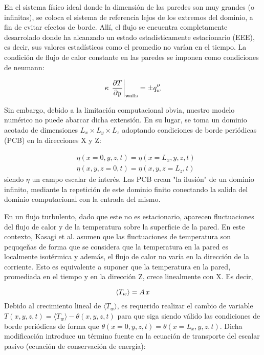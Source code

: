 En el sistema físico ideal donde la dimensión de las paredes son muy grandes (o infinitas), se coloca el sistema de referencia lejos de los extremos del dominio, a fin de evitar efectos de borde. Allí, el flujo se encuentra completamente desarrolado donde ha alcanzado un estado estadísticamente estacionario (EEE), es decir, sus valores estadísticos como el promedio no varían en el tiempo. La condición de flujo de calor constante en las paredes se imponen como condiciones de neumann:

\begin{equation}
\kappa \hspace{0.5mm} \left. \frac{\partial T}{\partial y} \right\vert_{\text{walls}} = \pm q''_w
\label{eq:neumann}
\end{equation}



Sin embargo, debido a la limitación computacional obvia, nuestro modelo numérico no puede abarcar dicha extensión. En su lugar, se toma un dominio acotado de dimensiones $L_x \times L_y \times L_z$ adoptando condiciones de borde periódicas (PCB) en la direcciones X y Z:

\begin{align}
& \eta(x=0,y,z,t) = \eta(x=L_x,y,z,t) \\ 
& \eta(x,y,z=0,t) = \eta(x,y,z=L_z,t)
\end{align}
siendo $\eta$ un campo escalar de interés. Las PCB crean "la ilusión" de un dominio infinito, mediante la repetición de este dominio finito conectando la salida del dominio computacional con la entrada del mismo.

En un flujo turbulento, dado que este no es estacionario, aparecen fluctuaciones del flujo de calor y de la temperatura sobre la superficie de la pared. En este contexto, Kasagi et al. \cite{kasagi1992direct} asumen que las fluctuaciones de temperatura son pequqeñas de forma que se considera que la temperatura en la pared es localmente isotérmica y además, el flujo de calor no varía en la dirección de la corriente. Esto es equivalente a suponer que la temperatura en la pared, promediada en el tiempo y en la dirección Z, crece linealmente con X. Es decir, 

$$
\langle T_w \rangle = A \hspace{0.5mm} x
$$
Debido al crecimiento lineal de $\langle T_w \rangle$, es requerido realizar el cambio de variable $T(x,y,z,t) = \langle T_w \rangle - \theta(x,y,z,t)$ para que siga siendo válido las condiciones de borde periódicas de forma que $\theta(x=0,y,z,t)=\theta(x=L_x,y,z,t)$. Dicha modificación introduce un término fuente en la ecuación de transporte del escalar pasivo (ecuación de conservación de energía):

